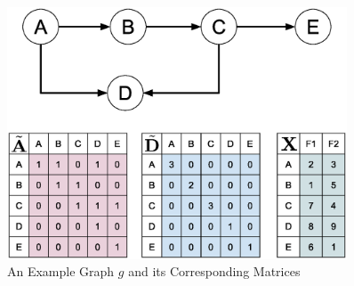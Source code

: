 \begin{figure}[htbp]
    \centerline{\includegraphics[width=0.90\textwidth]{Magic/figures/ExampleGraph.eps}}
    \caption{An Example Graph $g$ and its Corresponding Matrices}
    \label{MG:Fig:ExampleGraph}
\end{figure}

